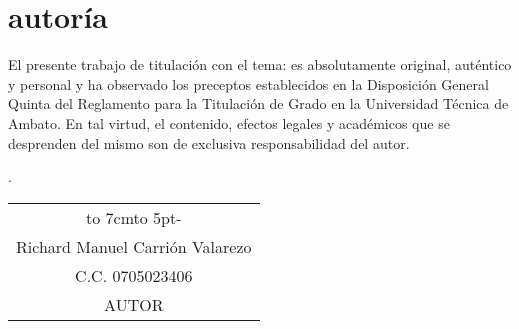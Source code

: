 \chapter*{autoría}
El presente trabajo de titulaci\'on con el tema: {\MakeUppercase\tema} es absolutamente original, auténtico y personal y ha observado
los preceptos establecidos en la Disposición General Quinta del Reglamento para la
Titulación de Grado en la Universidad Técnica de Ambato. En tal virtud, el contenido,
efectos legales y académicos que se desprenden del mismo son de exclusiva
responsabilidad del autor.\begin{flushright}
	\lugarFechaPrelims.
\end{flushright}

\vspace*{5cm}
\begin{center}
	\begin{tabular}{c}
		\hbox to 7cm{\leaders\hbox to 5pt{\hss - \hss}\hfil} \\
		Richard Manuel Carrión Valarezo                      \\
		C.C. 0705023406                                      \\
		AUTOR
	\end{tabular}
\end{center}
